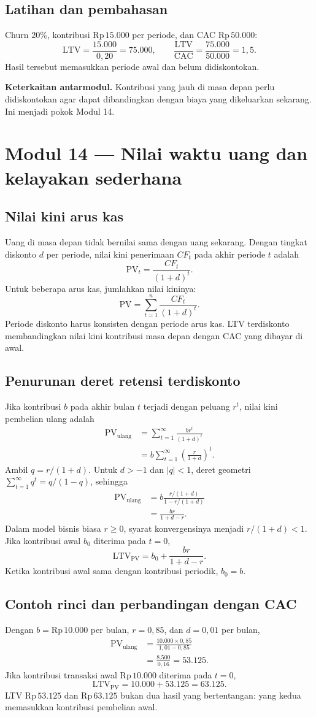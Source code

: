 \documentclass[11pt,a4paper]{article}
\newcommand{\modul}[2]{\clearpage\section{Modul #1 --- #2}}
\newcommand{\bagian}[1]{\Needspace{5\baselineskip}\subsection{#1}}
\newcommand{\jembatan}[1]{\par\textbf{Keterkaitan antarmodul.} #1\par}
\newcommand{\CAC}{\mathrm{CAC}}
\newcommand{\LTV}{\mathrm{LTV}}
\newcommand{\PV}{\mathrm{PV}}
\newcommand{\rp}[1]{\ensuremath{\mathrm{Rp}\,#1}}
\begin{document}
\bagian{Latihan dan pembahasan}
Churn \(20\%\), kontribusi \rp{15.000} per periode, dan CAC \rp{50.000}:
\[
\LTV=\frac{15.000}{0{,}20}=75.000,\qquad
\frac{\LTV}{\CAC}=\frac{75.000}{50.000}=1{,}5.
\]
Hasil tersebut memasukkan periode awal dan belum didiskontokan.
\jembatan{Kontribusi yang jauh di masa depan perlu didiskontokan agar dapat dibandingkan dengan biaya yang dikeluarkan sekarang. Ini menjadi pokok Modul 14.}

\modul{14}{Nilai waktu uang dan kelayakan sederhana}
\bagian{Nilai kini arus kas}
Uang di masa depan tidak bernilai sama dengan uang sekarang. Dengan tingkat diskonto \(d\) per periode, nilai kini penerimaan \(CF_t\) pada akhir periode \(t\) adalah
\[
\PV_t=\frac{CF_t}{(1+d)^t}.
\]
Untuk beberapa arus kas, jumlahkan nilai kininya:
\[
\PV=\sum_{t=1}^{n}\frac{CF_t}{(1+d)^t}.
\]
Periode diskonto harus konsisten dengan periode arus kas. LTV terdiskonto membandingkan nilai kini kontribusi masa depan dengan CAC yang dibayar di awal.

\bagian{Penurunan deret retensi terdiskonto}
Jika kontribusi \(b\) pada akhir bulan \(t\) terjadi dengan peluang \(r^t\), nilai kini pembelian ulang adalah
\[
\begin{aligned}
\PV_{\text{ulang}}
&=\sum_{t=1}^{\infty}\frac{br^t}{(1+d)^t}\\
&=b\sum_{t=1}^{\infty}\left(\frac{r}{1+d}\right)^t.
\end{aligned}
\]
Ambil \(q=r/(1+d)\). Untuk \(d>-1\) dan \(|q|<1\), deret geometri \(\sum_{t=1}^{\infty}q^t=q/(1-q)\), sehingga
\[
\begin{aligned}
\PV_{\text{ulang}}
&=b\frac{r/(1+d)}{1-r/(1+d)}\\
&=\frac{br}{1+d-r}.
\end{aligned}
\]
Dalam model bisnis biasa \(r\ge0\), syarat konvergensinya menjadi \(r/(1+d)<1\). Jika kontribusi awal \(b_0\) diterima pada \(t=0\),
\[
\LTV_{\PV}=b_0+\frac{br}{1+d-r}.
\]
Ketika kontribusi awal sama dengan kontribusi periodik, \(b_0=b\).

\bagian{Contoh rinci dan perbandingan dengan CAC}
Dengan \(b=\rp{10.000}\) per bulan, \(r=0{,}85\), dan \(d=0{,}01\) per bulan,
\[
\begin{aligned}
\PV_{\text{ulang}}&=\frac{10.000\times0{,}85}{1{,}01-0{,}85}\\
&=\frac{8.500}{0{,}16}=53.125.
\end{aligned}
\]
Jika kontribusi transaksi awal \rp{10.000} diterima pada \(t=0\),
\[
\LTV_{\PV}=10.000+53.125=63.125.
\]
LTV \rp{53.125} dan \rp{63.125} bukan dua hasil yang bertentangan: yang kedua memasukkan kontribusi pembelian awal.
\end{document}

